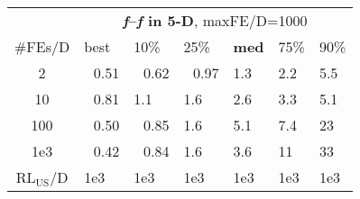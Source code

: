 \begin{tabular}{c|llllll}
 & \multicolumn{6}{|c}{\textbf{\textit{f}\raisebox{-0.35ex}{1}--\textit{f}\raisebox{-0.35ex}{24} in 5-D}, maxFE/D=1000}\\
\#FEs/D & best & 10\% & 25\% & \textbf{med} & 75\% & 90\%\\
2 & ~\,0.51 & ~\,0.62 & ~\,0.97 & \hspace*{1ex}1.3 & \hspace*{1ex}2.2 & \hspace*{1ex}5.5\\
10 & ~\,0.81 & \hspace*{1ex}1.1 & \hspace*{1ex}1.6 & \hspace*{1ex}2.6 & \hspace*{1ex}3.3 & \hspace*{1ex}5.1\\
100 & ~\,0.50 & ~\,0.85 & \hspace*{1ex}1.6 & \hspace*{1ex}5.1 & \hspace*{1ex}7.4 & 23\\
1e3 & ~\,0.42 & ~\,0.84 & \hspace*{1ex}1.6 & \hspace*{1ex}3.6 & 11 & 33\\
$\text{RL}_{\text{US}}$/D & 1e3 & 1e3 & 1e3 & 1e3 & 1e3 & 1e3
\end{tabular}
